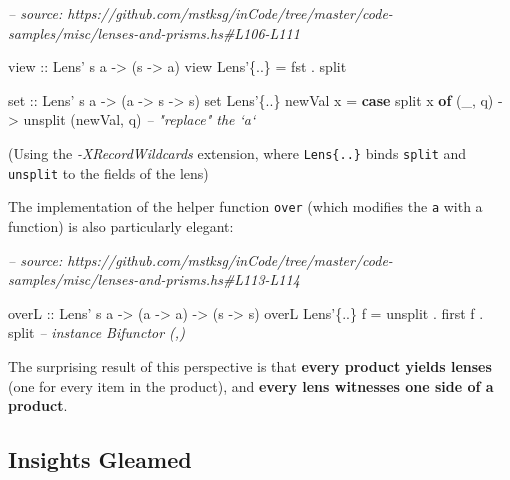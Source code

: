 \documentclass[]{article}
\newenvironment{Shaded}{}{}
\newcommand{\CommentTok}[1]{\textcolor[rgb]{0.38,0.63,0.69}{\textit{#1}}}
\newcommand{\DataTypeTok}[1]{\textcolor[rgb]{0.56,0.13,0.00}{#1}}
\newcommand{\FunctionTok}[1]{\textcolor[rgb]{0.02,0.16,0.49}{#1}}
\newcommand{\KeywordTok}[1]{\textcolor[rgb]{0.00,0.44,0.13}{\textbf{#1}}}
\newcommand{\NormalTok}[1]{#1}
\newcommand{\OtherTok}[1]{\textcolor[rgb]{0.00,0.44,0.13}{#1}}
\begin{document}
\begin{Shaded}
\begin{Highlighting}[]
\CommentTok{-- source: https://github.com/mstksg/inCode/tree/master/code-samples/misc/lenses-and-prisms.hs#L106-L111}

\OtherTok{view ::} \DataTypeTok{Lens'}\NormalTok{ s a }\OtherTok{->}\NormalTok{ (s }\OtherTok{->}\NormalTok{ a)}
\NormalTok{view }\DataTypeTok{Lens'}\NormalTok{\{}\FunctionTok{..}\NormalTok{\} }\FunctionTok{=}\NormalTok{ fst }\FunctionTok{.}\NormalTok{ split}

\OtherTok{set ::} \DataTypeTok{Lens'}\NormalTok{ s a }\OtherTok{->}\NormalTok{ (a }\OtherTok{->}\NormalTok{ s }\OtherTok{->}\NormalTok{ s)}
\NormalTok{set }\DataTypeTok{Lens'}\NormalTok{\{}\FunctionTok{..}\NormalTok{\} newVal x }\FunctionTok{=} \KeywordTok{case}\NormalTok{ split x }\KeywordTok{of}
\NormalTok{    (_, q) }\OtherTok{->}\NormalTok{ unsplit (newVal, q)      }\CommentTok{-- "replace" the `a`}
\end{Highlighting}
\end{Shaded}

(Using the \emph{-XRecordWildcards} extension, where
\texttt{Lens\textquotesingle{}\{..\}} binds \texttt{split} and \texttt{unsplit}
to the fields of the lens)

The implementation of the helper function \texttt{over} (which modifies the
\texttt{a} with a function) is also particularly elegant:

\begin{Shaded}
\begin{Highlighting}[]
\CommentTok{-- source: https://github.com/mstksg/inCode/tree/master/code-samples/misc/lenses-and-prisms.hs#L113-L114}

\OtherTok{overL ::} \DataTypeTok{Lens'}\NormalTok{ s a }\OtherTok{->}\NormalTok{ (a }\OtherTok{->}\NormalTok{ a) }\OtherTok{->}\NormalTok{ (s }\OtherTok{->}\NormalTok{ s)}
\NormalTok{overL }\DataTypeTok{Lens'}\NormalTok{\{}\FunctionTok{..}\NormalTok{\}  f }\FunctionTok{=}\NormalTok{ unsplit }\FunctionTok{.}\NormalTok{ first f }\FunctionTok{.}\NormalTok{ split   }\CommentTok{-- instance Bifunctor (,)}
\end{Highlighting}
\end{Shaded}

The surprising result of this perspective is that \textbf{every product yields
lenses} (one for every item in the product), and \textbf{every lens witnesses
one side of a product}.

\hypertarget{insights-gleamed}{%
\subsection{Insights Gleamed}\label{insights-gleamed}}
\end{document}
